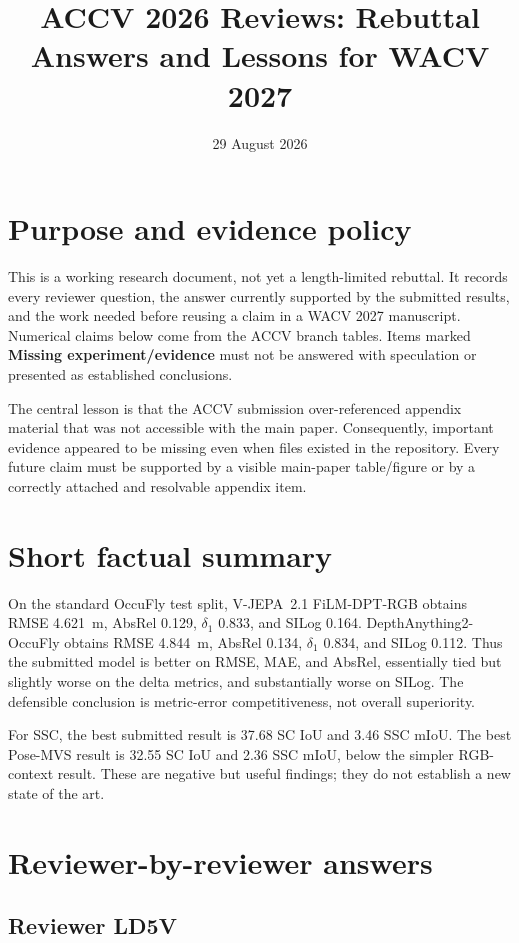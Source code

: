\documentclass[10pt]{article}
\title{ACCV 2026 Reviews: Rebuttal Answers and Lessons for WACV 2027}
\author{}
\date{29 August 2026}
\newcommand{\missing}{\textcolor{missing}{\textbf{Missing experiment/evidence}}}
\newcommand{\reviewer}[1]{\subsection{Reviewer #1}}
\begin{document}
\maketitle

\section{Purpose and evidence policy}

This is a working research document, not yet a length-limited rebuttal. It records every
reviewer question, the answer currently supported by the submitted results, and the work
needed before reusing a claim in a WACV 2027 manuscript. Numerical claims below come from
the ACCV branch tables. Items marked \missing{} must not be answered with speculation or
presented as established conclusions.

The central lesson is that the ACCV submission over-referenced appendix material that was
not accessible with the main paper. Consequently, important evidence appeared to be
missing even when files existed in the repository. Every future claim must be supported by
a visible main-paper table/figure or by a correctly attached and resolvable appendix item.

\section{Short factual summary}

On the standard OccuFly test split, V-JEPA~2.1 FiLM-DPT-RGB obtains RMSE 4.621~m,
AbsRel 0.129, $\delta_1$ 0.833, and SILog 0.164. DepthAnything2-OccuFly obtains RMSE
4.844~m, AbsRel 0.134, $\delta_1$ 0.834, and SILog 0.112. Thus the submitted model is
better on RMSE, MAE, and AbsRel, essentially tied but slightly worse on the delta metrics,
and substantially worse on SILog. The defensible conclusion is metric-error
competitiveness, not overall superiority.

For SSC, the best submitted result is 37.68 SC IoU and 3.46 SSC mIoU. The best
Pose-MVS result is 32.55 SC IoU and 2.36 SSC mIoU, below the simpler RGB-context result.
These are negative but useful findings; they do not establish a new state of the art.

\section{Reviewer-by-reviewer answers}

\reviewer{LD5V}
\end{document}
